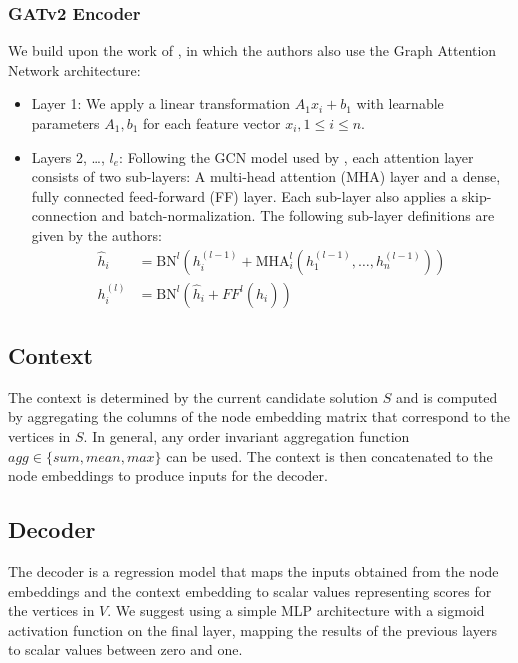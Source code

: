 \documentclass[draft,final]{vutinfth} %
\begin{document}
\subsubsection{GATv2 Encoder}
We build upon the work of \cite{Kool2019}, in which the authors also use the Graph Attention Network architecture:
\begin{itemize}
    \item Layer 1: We apply a linear transformation $A_1 x_i + b_1$ with learnable parameters $A_1, b_1$ for each feature vector $x_i, 1 \leq i \leq n$.
    \item Layers 2, \dots, $l_e$: Following the GCN model used by \cite{Kool2019}, each attention layer consists of two sub-layers: A multi-head attention (MHA) layer and a dense, fully connected feed-forward (FF) layer. Each sub-layer also applies a skip-connection and batch-normalization. The following sub-layer definitions are given by the authors: 
    \begin{align}
        \hat{h}_i &= \text{BN}^l(h_i^{(l-1)} + \text{MHA}_i^l (h_1^{(l-1)}, \dots , h_n^{(l-1)}) ) \\
        h_i^{(l)} &= \text{BN}^l(\hat{h}_i + FF^l(\hat{h}_i))
    \end{align}
\end{itemize}

\subsection{Context}
The context is determined by the current candidate solution $S$ and is computed by aggregating the columns of the node embedding matrix that correspond to the vertices in $S$. In general, any order invariant aggregation function $\mathit{agg} \in \{\mathit{sum, mean, max}\}$ can be used. The context is then concatenated to the node embeddings to produce inputs for the decoder. 

\subsection{Decoder}
The decoder is a regression model that maps the inputs obtained from the node embeddings and the context embedding to scalar values representing scores for the vertices in $V$. We suggest using a simple MLP architecture with a sigmoid activation function on the final layer, mapping the results of the previous layers to scalar values between zero and one. 

\end{document}
